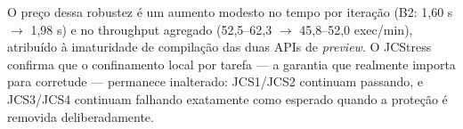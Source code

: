 O preço dessa robustez é um aumento modesto no tempo por iteração (B2:
1,60 s $\to$ 1,98 s) e no throughput agregado (52,5--62,3 $\to$
45,8--52,0 exec/min), atribuído à imaturidade de compilação das duas
APIs de \textit{preview}. O JCStress confirma que o confinamento local
por tarefa --- a garantia que realmente importa para corretude ---
permanece inalterado: JCS1/JCS2 continuam passando, e JCS3/JCS4
continuam falhando exatamente como esperado quando a proteção é
removida deliberadamente.
